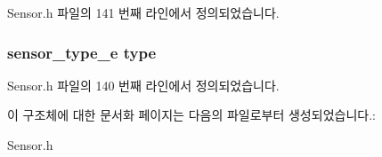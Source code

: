 Sensor.\-h 파일의 141 번째 라인에서 정의되었습니다.

\hypertarget{struct___sensor_extend_abffb09766da2fc510a79bb51f82a36e1}{
\subsubsection[{type}]{\setlength{\rightskip}{0pt plus 5cm}sensor\-\_\-type\-\_\-e type}}\label{struct___sensor_extend_abffb09766da2fc510a79bb51f82a36e1}


Sensor.\-h 파일의 140 번째 라인에서 정의되었습니다.



이 구조체에 대한 문서화 페이지는 다음의 파일로부터 생성되었습니다.\-:\begin{DoxyCompactItemize}
\item 
Sensor.\-h\end{DoxyCompactItemize}
